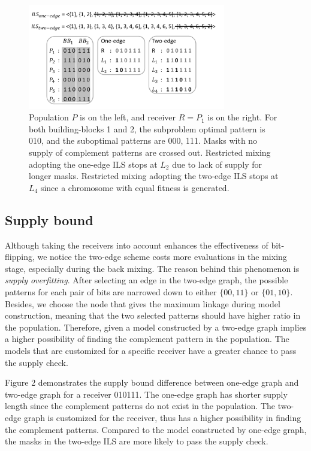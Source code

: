 \documentclass{sig-alternate-05-2015}
\begin{document}
\begin{figure}
\centering
\includegraphics[width=3.4in]{SupplyBound}
\caption{Population $ P $ is on the left, and receiver $ R  = P_{1} $ is on the right. For both building-blocks 1 and 2, the subproblem optimal pattern is 010, and the suboptimal patterns are 000, 111. Masks with no supply of complement patterns are crossed out. Restricted mixing adopting the one-edge ILS stops at $ L_{2}$ due to lack of supply for longer masks. Restricted mixing adopting the two-edge ILS stops at $ L_{4} $ since a chromosome with equal fitness is generated.}
\end{figure}



\subsection{Supply bound}
Although taking the receivers into account enhances the effectiveness of bit-flipping, we notice the two-edge scheme costs more evaluations in the mixing stage, especially during the back mixing. The reason behind this phenomenon is \textit{supply overfitting}. After selecting an edge in the two-edge graph, the possible patterns for each pair of bits are narrowed down to either $\{00, 11\}$ or $\{01, 10\}$. Besides, we choose the node that gives the maximum linkage during model construction, meaning that the two selected patterns should have higher ratio in the population. Therefore, given a model constructed by a two-edge graph implies a higher possibility of finding the complement pattern in the population. The models that are customized for a specific receiver have a greater chance to pass the supply check. 


Figure 2 demonstrates the supply bound difference between one-edge graph and two-edge graph for a receiver 010111. The one-edge graph has shorter supply length since the complement patterns do not exist in the population. The two-edge graph is customized for the receiver, thus has a higher possibility in finding the complement patterns. Compared to the model constructed by one-edge graph, the masks in the two-edge ILS are more likely to pass the supply check. 
\end{document}
